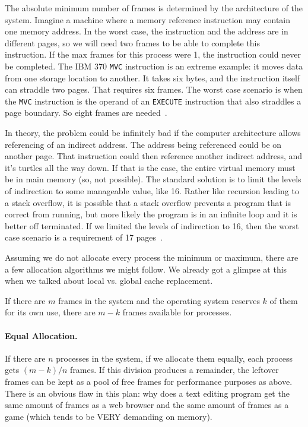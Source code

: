 The absolute minimum number of frames is determined by the architecture of the system. Imagine a machine where a memory reference instruction may contain one memory address. In the worst case, the instruction and the address are in different pages, so we will need two frames to be able to complete this instruction. If the max frames for this process were 1, the instruction could never be completed.  The IBM 370 \texttt{MVC} instruction is an extreme example: it moves data from one storage location to another. It takes six bytes, and the instruction itself can straddle two pages. That requires six frames. The worst case scenario is when the \texttt{MVC} instruction is the operand of an \texttt{EXECUTE} instruction that also straddles a page boundary. So eight frames are needed~\cite{osc}.

In theory, the problem could be infinitely bad if the computer architecture allows referencing of an indirect address. The address being referenced could be on another page. That instruction could then reference another indirect address, and it's turtles all the way down. If that is the case, the entire virtual memory must be in main memory (so, not possible). The standard solution is to limit the levels of indirection to some manageable value, like 16. Rather like recursion leading to a stack overflow, it is possible that a stack overflow prevents a program that is correct from running, but more likely the program is in an infinite loop and it is better off terminated. If we limited the levels of indirection to 16, then the worst case scenario is a requirement of 17 pages~\cite{osc}.

Assuming we do not allocate every process the minimum or maximum, there are a few allocation algorithms we might follow. We already got a glimpse at this when we talked about local vs. global cache replacement.

If there are $m$ frames in the system and the operating system reserves $k$ of them for its own use, there are $m-k$ frames available for processes.

\paragraph{Equal Allocation.}  If there are $n$ processes in the system, if we allocate them equally, each process gets $(m-k)/n$ frames. If this division produces a remainder, the leftover frames can be kept as a pool of free frames for performance purposes as above. There is an obvious flaw in this plan: why does a text editing program get the same amount of frames as a web browser and the same amount of frames as a game (which tends to be VERY demanding on memory).

